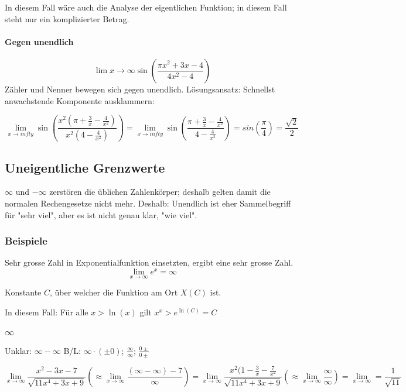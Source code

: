In diesem Fall wäre auch die Analyse der eigentlichen Funktion; in diesem Fall steht nur ein komplizierter Betrag.

\paragraph{Gegen unendlich}

\[
	\lim\limits{x \to \infty} \sin(\frac{\pi x^2 + 3x - 4}{4x^2-4})
\]
Zähler und Nenner bewegen sich gegen unendlich. Lösungsansatz: Schnellst anwachstende Komponente ausklammern:

\[
	\lim\limits_{x \to infty} \sin(\frac{x^2(\pi + \frac{3}{x} - \frac{4}{x^2})}{x^2(4 - \frac{4}{x^2})}) =
	\lim\limits_{x \to infty} \sin(\frac{\pi + \frac{3}{x} - \frac{4}{x^2}}{4 - \frac{4}{x^2}}) = sin(\frac{\pi}{4}) = \frac{\sqrt{2}}{2}
\]


\subsection{Uneigentliche Grenzwerte}

$\infty$ und $-\infty$ zerstören die üblichen Zahlenkörper; deshalb gelten damit die normalen Rechengesetze nicht mehr. Deshalb: Unendlich ist eher Sammelbegriff für "sehr viel", aber es ist nicht genau klar, "wie viel".


\subsubsection{Beispiele}
Sehr grosse Zahl in Exponentialfunktion einsetzten, ergibt eine sehr grosse Zahl.
\[
	\lim\limits_{x \to \infty} e^x = \infty
\]

Konstante $C$, über welcher die Funktion am Ort $X(C)$ ist.

In diesem Fall: Für alle $x > \ln(x)$ gilt $x^x > e^{\ln(C)} = C$


\subsubsection{$\infty$}

Unklar: $\infty - \infty$
B/L: $\infty \cdot (\pm 0)$; $\frac{\infty}{\infty}$; $\frac{0\pm}{0\pm}$

\[
	\lim\limits_{ x \to \infty} \frac{x^2-3x -7}{\sqrt{11x^4+3x+9}} \left(\approx \lim\limits_{ x \to \infty} \frac{(\infty - \infty) - 7}{\infty}\right) =
	 \lim\limits_{ x \to \infty} \frac{x^2 (1 - \frac{3}{x} - \frac{7}{x^2}}{\sqrt{11x^4 + 3x + 9}} \left(\approx \lim\limits_{ x \to \infty} \frac{\infty}{\infty}\right) =
	 \lim\limits_{x \to \infty} %
	 = \frac{1}{\sqrt{11}}
\]

